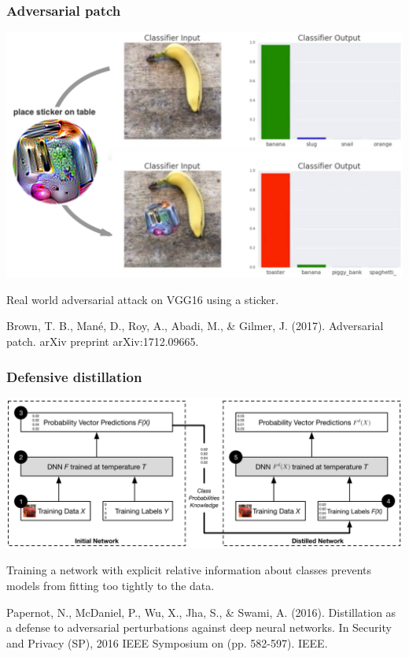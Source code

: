 \documentclass[9pt]{beamer}
\begin{document}
\begin{frame}
  \frametitle{Adversarial patch}

  \begin{center}
    \includegraphics[width = 0.8\linewidth]{images/adversarial_patch.png}
  \end{center}

  \medskip

  Real world adversarial attack on VGG16 using a sticker.

  \medskip

  {\scriptsize Brown, T. B., Mané, D., Roy, A., Abadi, M., \& Gilmer,
    J. (2017). Adversarial patch. arXiv preprint arXiv:1712.09665.}
\end{frame}

\begin{frame}
  \frametitle{Defensive distillation}

  \begin{center}
    \includegraphics[width = 0.9\linewidth]{images/distillation.png}
  \end{center}

  \medskip

  Training a network with explicit relative information about classes
  prevents models from fitting too tightly to the data.

  \medskip

  {\scriptsize Papernot, N., McDaniel, P., Wu, X., Jha, S., \& Swami,
    A. (2016). Distillation as a defense to adversarial perturbations
    against deep neural networks. In Security and Privacy (SP), 2016
    IEEE Symposium on (pp. 582-597). IEEE.}

\end{frame}
\end{document}
